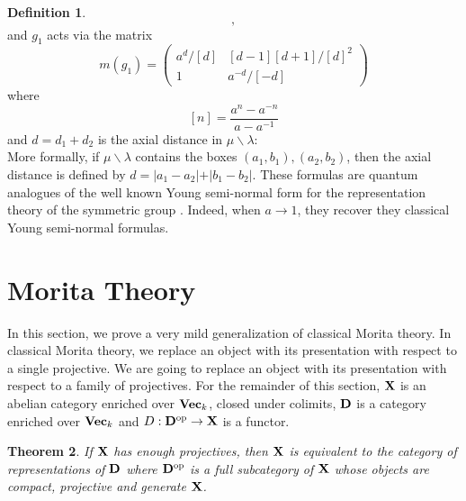 \documentclass[12pt]{amsart}
\theoremstyle{plain}
\newtheorem{Theorem}{Theorem}
\theoremstyle{definition}
\newtheorem{Definition}[Theorem]{Definition}
\newcommand{\Vect}{{\bf Vec}}
\newcommand{\XX}{{\bf X}}
\newcommand{\DD}{{\bf D}}
\begin{document}
\begin{Definition}
\[ \; , \;

\]
and $g_1$ acts via the matrix
\[
m(g_1) =
\begin{pmatrix}
a^{d}/[d] & [d-1][d+1]/[d]^2 \\
1 & a^{-d} / [-d]
\end{pmatrix}
\]
where
\[
[n] = \frac{a^n - a^{-n}}{a-a^{-1}}
\]
and $d = d_1 + d_2$ is the axial distance in $\mu \backslash \lambda$:
\[

\]
More formally, if $\mu \backslash \lambda$ contains the boxes $(a_1,b_1),(a_2,b_2)$, then the axial distance is defined by $d = \lvert a_1 - a_2 \lvert + \lvert b_1 - b_2 \lvert$. These formulas are quantum analogues of the well known Young semi-normal form for the representation theory of the symmetric group \cite{MR644144}. Indeed, when $a \to 1$, they recover they classical Young semi-normal formulas.

\end{Definition}


\section{Morita Theory} \label{sec:morita_theory}

In this section, we prove a very mild generalization of classical Morita theory. In classical Morita theory, we replace an object with its presentation with respect to a single projective. We are going to replace an object with its presentation with respect to a family of projectives. For the remainder of this section, $\XX$ is an abelian category enriched over $\Vect_k$, closed under colimits, $\DD$ is a category enriched over $\Vect_k$ and $D : \DD^{\rm op} \to \XX$ is a functor.

\begin{Theorem} \label{thm:morita_theory_main_thm}
If $\XX$ has enough projectives, then $\XX$ is equivalent to the category of representations of $\DD$ where $\DD^{\rm op}$ is a full subcategory of $\XX$ whose objects are compact, projective and generate $\XX$.
\end{Theorem}
\end{document}
